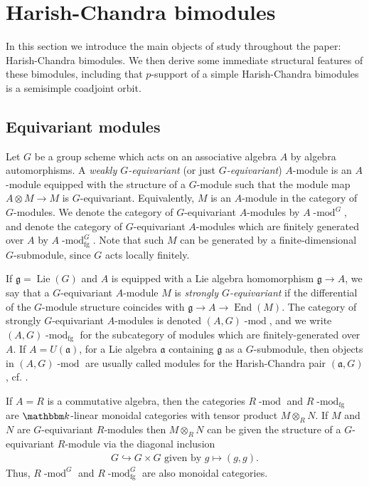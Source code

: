 \documentclass[twoside,12pt,reqno]{amsart}
\theoremstyle{remark}
\numberwithin{equation}{section}
\def\k{{\mathbbm k}}
\def\lmod{\!\operatorname{-mod}}
\def\Lie{\operatorname{Lie}}
\def\End{\operatorname{End}}
\def\g{{\mathfrak g}}
\def\a{\mathfrak{a}}
\def\a{\mathfrak{a}}
\newcommand{\fg}{\operatorname{fg}}
\begin{document}
\section{Harish-Chandra bimodules}\label{s:HCbimods}

In this section we introduce the main objects of study throughout the paper: Harish-Chandra bimodules. We then derive some immediate structural features of these bimodules, including that $p$-support of a simple Harish-Chandra bimodules is a semisimple coadjoint orbit.

\subsection{Equivariant modules}
\label{ss:equivariantmodules}

Let $G$ be a group scheme which acts on an associative algebra $A$ by algebra automorphisms. A {\it weakly $G$-equivariant} (or just {\it $G$-equivariant}) $A$-module is an $A$-module equipped with the structure of a $G$-module such that the module map $A\otimes M\to M$ is $G$-equivariant. Equivalently, $M$ is an $A$-module in the category of $G$-modules. We denote the category of $G$-equivariant $A$-modules by $A\lmod^G$, and denote the category of $G$-equivariant $A$-modules which are finitely generated over $A$ by $A\lmod^G_{\fg}$. Note that such $M$ can be generated by a finite-dimensional $G$-submodule, since $G$ acts locally finitely.

If $\g = \Lie(G)$ and $A$ is equipped with a Lie algebra homomorphism $\g\to A$, we say that a $G$-equivariant $A$-module $M$ is {\it strongly $G$-equivariant} if the differential of the $G$-module structure coincides with $\g \to A \to \End(M)$. The category of strongly $G$-equivariant $A$-modules is denoted $(A,G)\lmod$, and we write $(A,G)\lmod_{\fg}$ for the subcategory of modules which are finitely-generated over $A$. If $A=U(\a)$, for a Lie algebra $\a$ containing $\g$ as a $G$-submodule, then objects in $(A,G)\lmod$ are usually called modules for the Harish-Chandra pair $(\a,G)$, cf. \cite[]{Et}.



If $A=R$ is a commutative algebra, then the categories $R\lmod$ and $R\lmod_{\fg}$ are $\k$-linear monoidal categories with tensor product $M\otimes_R N$. If $M$ and $N$ are $G$-equivariant $R$-modules then $M\otimes_R N$ can be given the structure of a $G$-equivariant $R$-module via the diagonal inclusion
\begin{eqnarray}
\label{eq:diagonalembedding}
G\hookrightarrow G\times G \text{ given by } g\mapsto (g,g).    
\end{eqnarray}
Thus, $R\lmod^G$ and $R\lmod_{\fg}^G$ are also monoidal categories.
\end{document}
